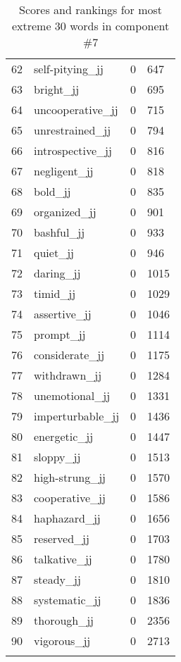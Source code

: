\begin{longtable}[!htbp]{| rlr@{.}l |}
    62 & self-pitying\_jj & 0 & 647 \\
    63 & bright\_jj & 0 & 695 \\
    64 & uncooperative\_jj & 0 & 715 \\
    65 & unrestrained\_jj & 0 & 794 \\
    66 & introspective\_jj & 0 & 816 \\
    67 & negligent\_jj & 0 & 818 \\
    68 & bold\_jj & 0 & 835 \\
    69 & organized\_jj & 0 & 901 \\
    70 & bashful\_jj & 0 & 933 \\
    71 & quiet\_jj & 0 & 946 \\
    72 & daring\_jj & 0 & 1015 \\
    73 & timid\_jj & 0 & 1029 \\
    74 & assertive\_jj & 0 & 1046 \\
    75 & prompt\_jj & 0 & 1114 \\
    76 & considerate\_jj & 0 & 1175 \\
    77 & withdrawn\_jj & 0 & 1284 \\
    78 & unemotional\_jj & 0 & 1331 \\
    79 & imperturbable\_jj & 0 & 1436 \\
    80 & energetic\_jj & 0 & 1447 \\
    81 & sloppy\_jj & 0 & 1513 \\
    82 & high-strung\_jj & 0 & 1570 \\
    83 & cooperative\_jj & 0 & 1586 \\
    84 & haphazard\_jj & 0 & 1656 \\
    85 & reserved\_jj & 0 & 1703 \\
    86 & talkative\_jj & 0 & 1780 \\
    87 & steady\_jj & 0 & 1810 \\
    88 & systematic\_jj & 0 & 1836 \\
    89 & thorough\_jj & 0 & 2356 \\
    90 & vigorous\_jj & 0 & 2713 \\
    \hline
    \caption{Scores and rankings for most extreme 30 words in component \#7} \\
\end{longtable}
